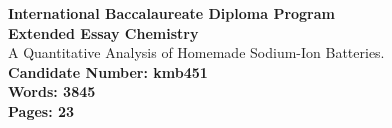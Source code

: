 \begin{titlepage}
\begin{center}
\textbf{International Baccalaureate Diploma Program}
\vspace{10cm}\\
\Huge
\textbf{Extended Essay Chemistry}
\vspace{0.5cm}\\
\LARGE
A Quantitative Analysis of Homemade Sodium-Ion Batteries.
\vspace{8.5cm}\\
\small
\textbf{Candidate Number: kmb451}\\
\textbf{Words: 3845}\\
\textbf{Pages: 23}
\vfill
\date{\today}
\end{center}
\end{titlepage}